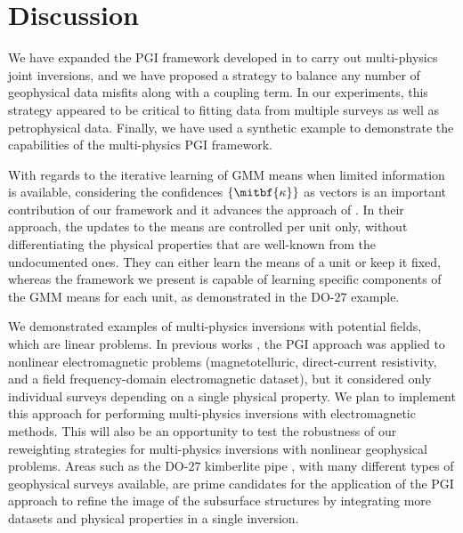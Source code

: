 \documentclass[extra, mreferee]{gji_joint} %
\begin{document}
\section{Discussion}

We have expanded the PGI framework developed in \citet{ggz389} to carry out multi-physics joint inversions, and we have proposed a strategy to balance any number of geophysical data misfits along with a coupling term. In our experiments, this strategy appeared to be critical to fitting data from multiple surveys as well as petrophysical data. Finally, we have used a synthetic example to demonstrate the capabilities of the multi-physics PGI framework.

With regards to the iterative learning of GMM means when limited information is available, considering the confidences $\{\mitbf{\kappa}\}$ as vectors is an important contribution of our framework and it advances the approach of \citet{Sun2016}. In their approach, the updates to the means are controlled per unit only, without differentiating the physical properties that are well-known from the undocumented ones. They can either learn the means of a unit or keep it fixed, whereas the framework we present is capable of learning specific components of the GMM means for each unit, as demonstrated in the DO-$27$ example.

We demonstrated examples of multi-physics inversions with potential fields, which are linear problems. In previous works \citep{ggz389}, the PGI approach was applied to nonlinear electromagnetic problems (magnetotelluric, direct-current resistivity, and a field frequency-domain electromagnetic dataset), but it considered only individual surveys depending on a single physical property. We plan to implement this approach for performing multi-physics inversions with electromagnetic methods. This will also be an opportunity to test the robustness of our reweighting strategies for multi-physics inversions with nonlinear geophysical problems. Areas such as the DO-$27$ kimberlite pipe \citep{TKCpaper, TKCEM, TKCIP}, with many different types of geophysical surveys available, are prime candidates for the application of the PGI approach to refine the image of the subsurface structures by integrating more datasets and physical properties in a single inversion.
\end{document}
